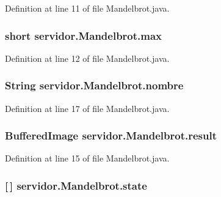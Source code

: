 Definition at line 11 of file Mandelbrot.\+java.

\subsubsection[{\texorpdfstring{max}{max}}]{\setlength{\rightskip}{0pt plus 5cm}short servidor.\+Mandelbrot.\+max\hspace{0.3cm}{\ttfamily [private]}}\hypertarget{classservidor_1_1Mandelbrot_ae06594a9f8593fa65bb4cfc6f6360ebe}{}\label{classservidor_1_1Mandelbrot_ae06594a9f8593fa65bb4cfc6f6360ebe}


Definition at line 12 of file Mandelbrot.\+java.

\subsubsection[{\texorpdfstring{nombre}{nombre}}]{\setlength{\rightskip}{0pt plus 5cm}String servidor.\+Mandelbrot.\+nombre\hspace{0.3cm}{\ttfamily [package]}}\hypertarget{classservidor_1_1Mandelbrot_ae1f139c807578878bf03527602d6a91f}{}\label{classservidor_1_1Mandelbrot_ae1f139c807578878bf03527602d6a91f}


Definition at line 17 of file Mandelbrot.\+java.

\subsubsection[{\texorpdfstring{result}{result}}]{\setlength{\rightskip}{0pt plus 5cm}Buffered\+Image servidor.\+Mandelbrot.\+result\hspace{0.3cm}{\ttfamily [package]}}\hypertarget{classservidor_1_1Mandelbrot_a7ffdb7e65dc12cace2516fdb2882d47d}{}\label{classservidor_1_1Mandelbrot_a7ffdb7e65dc12cace2516fdb2882d47d}


Definition at line 15 of file Mandelbrot.\+java.

\subsubsection[{\texorpdfstring{state}{state}}]{ \mbox{[}$\,$\mbox{]} servidor.\+Mandelbrot.\+state\hspace{0.3cm}{\ttfamily [private]}}\hypertarget{classservidor_1_1Mandelbrot_a6d343b003d86dbdf317c26c2f55af9eb}{}\label{classservidor_1_1Mandelbrot_a6d343b003d86dbdf317c26c2f55af9eb}


